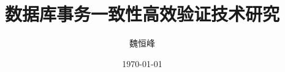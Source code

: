 \documentclass[]{beamer}
\title[]{数据库事务一致性高效验证技术研究}
\subtitle{}
\author[魏恒峰]{魏恒峰}
\institute{hfwei@nju.edu.cn}
\date{\today}
\begin{document}
\maketitle






\thankyou{}
\end{document}
